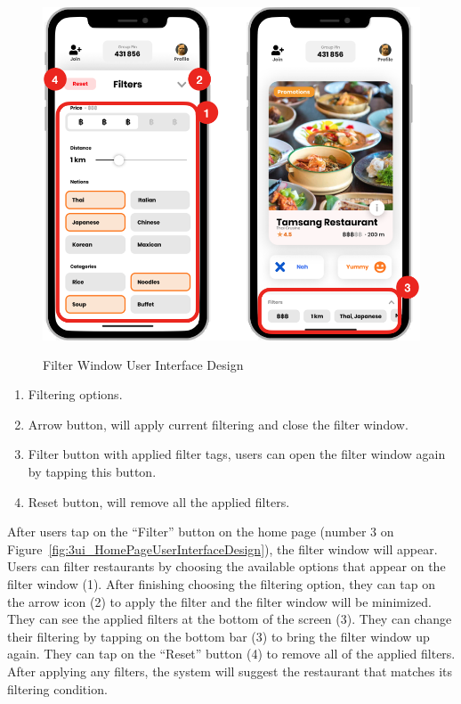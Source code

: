 \documentclass[12pt,oneside,openright,a4paper]{cpe-english-project}
\begin{document}
\begin{figure}[H]\centering
\includegraphics[height=300pt]{./images/3ui_FilterWindowUserInterfaceDesign.png}
\caption{Filter Window User Interface Design}\label{fig:3ui_FilterWindowUserInterfaceDesign}
\end{figure}
\begin{enumerate}
\item Filtering options.
\item Arrow button, will apply current filtering and close the filter window.
\item Filter button with applied filter tags, users can open the filter window again by tapping this button.
\item Reset button, will remove all the applied filters.
\end{enumerate}
After users tap on the “Filter” button on the home page (number 3 on Figure~\ref{fig:3ui_HomePageUserInterfaceDesign}), the filter window will appear. Users can filter restaurants by choosing the available options that appear on the filter window (1). After finishing choosing the filtering option, they can tap on the arrow icon (2) to apply the filter and the filter window will be minimized. They can see the applied filters at the bottom of the screen (3). They can change their filtering by tapping on the bottom bar (3) to bring the filter window up again. They can tap on the “Reset” button (4) to remove all of the applied filters. After applying any filters, the system will suggest the restaurant that matches its filtering condition.
\newpage
\end{document}
